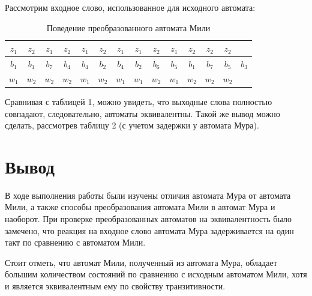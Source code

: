 \documentclass[listings]{labreport}
\begin{document}
Рассмотрим входное слово, использованное для исходного автомата:

\begin{table}[h]
\begin{tabular}{|c|c|c|c|c|c|c|c|c|c|c|c|c|c|}
\hline
$z_1$ & $z_2$ & $z_1$ & $z_2$ & $z_1$ & $z_2$ & $z_1$ & $z_1$ & $z_2$ & $z_1$ & $z_2$ & $z_2$ & $z_2$ & \\\hline

$b_1$ & $b_1$ & $b_7$ & $b_4$ & $b_4$ & $b_2$ & $b_4$ & $b_2$ & $b_6$ & $b_5$ & $b_1$ & $b_7$ & $b_5$ & $b_3$ \\\hline

$w_1$ & $w_2$ & $w_2$ & $w_2$ & $w_1$ & $w_2$ & $w_1$ & $w_1$ & $w_2$ & $w_1$ & $w_2$ & $w_2$ & $w_2$ & \\\hline
\end{tabular}
\caption{Поведение преобразованного автомата Мили}
\end{table}

Сравнивая с таблицей 1, можно увидеть, что выходные слова полностью совпадают, следовательно, автоматы эквивалентны. Такой же вывод можно сделать, рассмотрев таблицу 2 (с учетом задержки у автомата Мура).

\section*{Вывод}

В ходе выполнения работы были изучены отличия автомата Мура от автомата Мили, а также способы преобразования автомата Мили в автомат Мура и наоборот. При проверке преобразованных автоматов на эквивалентность было замечено, что реакция на входное слово автомата Мура задерживается на один такт по сравнению с автоматом Мили.

Стоит отметь, что автомат Мили, полученный из автомата Мура, обладает большим количеством состояний по сравнению с исходным автоматом Мили, хотя и является эквивалентным ему по свойству транзитивности.
\end{document}

